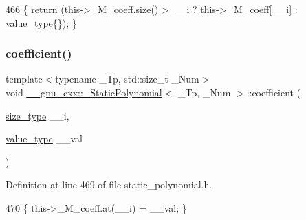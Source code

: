 \begin{DoxyCode}
466       \{ \textcolor{keywordflow}{return} (this->\_M\_coeff.size() > \_\_i ? this->\_M\_coeff[\_\_i] : \hyperlink{class____gnu__cxx_1_1__StaticPolynomial_af23110f5a002cd6caa3542df7cf35284}{value\_type}\{\}); \}
\end{DoxyCode}
\mbox{\label{class____gnu__cxx_1_1__StaticPolynomial_a288f2c23e789bd68071223c091b5dae1}} 
\subsubsection{\texorpdfstring{coefficient()}{coefficient()}\hspace{0.1cm}{\footnotesize\ttfamily [2/2]}}
{\footnotesize\ttfamily template$<$typename \+\_\+\+Tp, std\+::size\+\_\+t \+\_\+\+Num$>$ \\
void \hyperlink{class____gnu__cxx_1_1__StaticPolynomial}{\+\_\+\+\_\+gnu\+\_\+cxx\+::\+\_\+\+Static\+Polynomial}$<$ \+\_\+\+Tp, \+\_\+\+Num $>$\+::coefficient (\begin{DoxyParamCaption}\item[{\hyperlink{class____gnu__cxx_1_1__StaticPolynomial_a3384ce6a956ad398fc995e6ee53b2b18}{size\+\_\+type}}]{\+\_\+\+\_\+i,  }\item[{\hyperlink{class____gnu__cxx_1_1__StaticPolynomial_af23110f5a002cd6caa3542df7cf35284}{value\+\_\+type}}]{\+\_\+\+\_\+val }\end{DoxyParamCaption})\hspace{0.3cm}{\ttfamily [inline]}}



Definition at line 469 of file static\+\_\+polynomial.\+h.


\begin{DoxyCode}
470       \{ this->\_M\_coeff.at(\_\_i) = \_\_val; \}
\end{DoxyCode}
\mbox{\label{class____gnu__cxx_1_1__StaticPolynomial_a19051b9e3bdb60c9ec90f5c3db7ba958}} 
